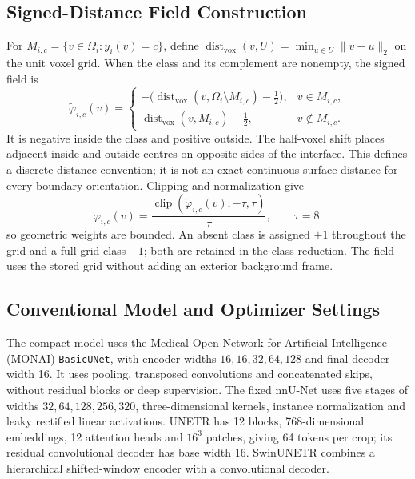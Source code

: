 \documentclass[12pt,a4paper]{article}
\begin{document}
\subsection{Signed-Distance Field Construction}
\label{sec:sdf-construction-details}

For $M_{i,c}=\{v\in\Omega_i:y_i(v)=c\}$, define
$\operatorname{dist}_{\mathrm{vox}}(v,U)=\min_{u\in U}\|v-u\|_2$
on the unit voxel grid. When the class and its complement are nonempty,
the signed field is
\begin{equation}
\widetilde\varphi_{i,c}(v)=
\begin{cases}
-\bigl(\operatorname{dist}_{\mathrm{vox}}
       (v,\Omega_i\setminus M_{i,c})-\tfrac12\bigr),
   &v\in M_{i,c},\\[0.4em]
\operatorname{dist}_{\mathrm{vox}}(v,M_{i,c})-\tfrac12,
   &v\notin M_{i,c}.
\end{cases}
\label{eq:sdf-half-voxel-field}
\end{equation}
It is negative inside the class and positive outside. The half-voxel
shift places adjacent inside and outside centres on opposite sides of
the interface. This defines a discrete distance convention; it is not
an exact continuous-surface distance for every boundary orientation.
Clipping and normalization give
\begin{equation}
\varphi_{i,c}(v)
=\frac{\operatorname{clip}
  (\widetilde\varphi_{i,c}(v),-\tau,\tau)}{\tau},
\qquad \tau=8.
\label{eq:sdf-clipped-normalized-field}
\end{equation}
so geometric weights are bounded. An absent class is assigned $+1$
throughout the grid and a full-grid class $-1$; both are retained in
the class reduction. The field uses the stored grid without adding an
exterior background frame.


\subsection{Conventional Model and Optimizer Settings}
\label{sec:conventional-implementation}

The compact model uses the Medical Open Network for Artificial Intelligence
(MONAI) \texttt{BasicUNet}, with encoder widths
$16,16,32,64,128$ and final decoder width 16. It uses pooling,
transposed convolutions and concatenated skips, without residual blocks
or deep supervision. The fixed nnU-Net uses five stages of widths
$32,64,128,256,320$, three-dimensional kernels, instance normalization
and leaky rectified linear activations. UNETR has 12 blocks,
768-dimensional embeddings, 12 attention heads and $16^3$ patches,
giving 64 tokens per crop; its residual convolutional decoder has
base width 16. SwinUNETR combines a hierarchical shifted-window encoder
with a convolutional decoder.
\end{document}
